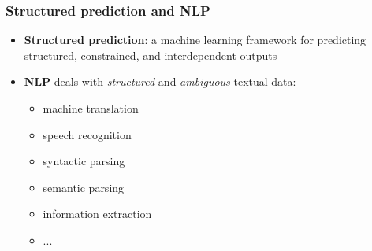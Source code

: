 
\def\vecwidth{.8}
\def\vecheight{.8}

\begin{frame}
  \frametitle{Structured prediction and NLP}
\begin{itemize}
\item \textbf{Structured prediction}: a machine learning framework for predicting
  structured, constrained, and interdependent outputs
\item \textbf{NLP} deals with \emph{structured} and \emph{ambiguous} textual data:
\begin{itemize}
  \item machine translation
  \item speech recognition
  \item syntactic parsing
  \item semantic parsing
  \item information extraction
  \item ...
\end{itemize}
\end{itemize}
\end{frame}

